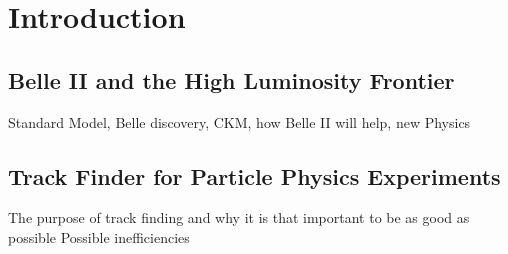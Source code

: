 \chapter{Introduction}
\section{Belle II and the High Luminosity Frontier}
Standard Model, Belle discovery, CKM, how Belle II will help, new Physics
\section{Track Finder for Particle Physics Experiments}
The purpose of track finding and why it is that important to be as good as possible
Possible inefficiencies